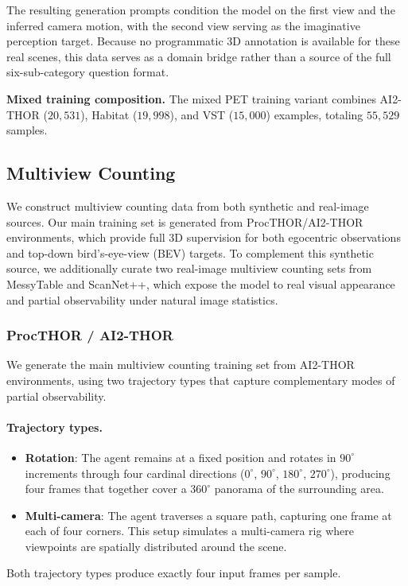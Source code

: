 The resulting generation prompts condition the model on the first view and the inferred camera motion, with the second view serving as the imaginative perception target. Because no programmatic 3D annotation is available for these real scenes, this data serves as a domain bridge rather than a source of the full six-sub-category question format.

\noindent\textbf{Mixed training composition.}
The mixed PET training variant combines AI2-THOR ($20{,}531$), Habitat ($19{,}998$), and VST ($15{,}000$) examples, totaling $55{,}529$ samples.

\subsection{Multiview Counting}
\label{supp_data_mvc}

We construct multiview counting data from both synthetic and real-image sources.
Our main training set is generated from ProcTHOR/AI2-THOR environments, which provide full 3D supervision for both egocentric observations and top-down bird's-eye-view (BEV) targets.
To complement this synthetic source, we additionally curate two real-image multiview counting sets from MessyTable and ScanNet++, which expose the model to real visual appearance and partial observability under natural image statistics.

\subsubsection{ProcTHOR / AI2-THOR}

We generate the main multiview counting training set from AI2-THOR environments, using two trajectory types that capture complementary modes of partial observability.

\paragraph{Trajectory types.}
\begin{itemize}
  \item \textbf{Rotation}: The agent remains at a fixed position and rotates in $90^\circ$ increments through four cardinal directions ($0^\circ$, $90^\circ$, $180^\circ$, $270^\circ$), producing four frames that together cover a $360^\circ$ panorama of the surrounding area.
  \item \textbf{Multi-camera}: The agent traverses a square path, capturing one frame at each of four corners. This setup simulates a multi-camera rig where viewpoints are spatially distributed around the scene.
\end{itemize}
Both trajectory types produce exactly four input frames per sample.


